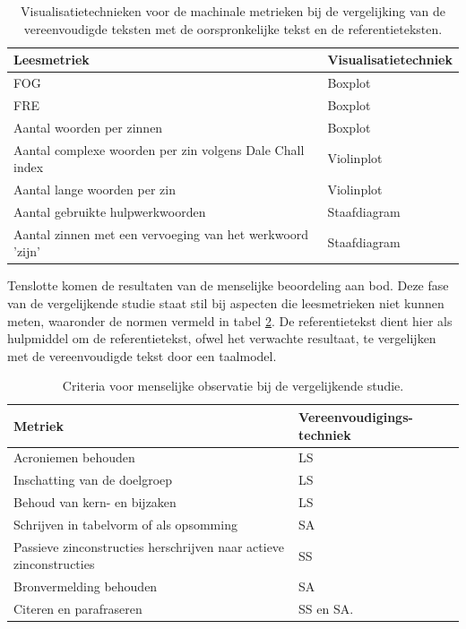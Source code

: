 \begin{center}
	\begin{table}[H]
		\begin{tabular}{ | m{8cm} | m{7cm} | } 
			\hline
			\textbf{Leesmetriek} & \textbf{Visualisatietechniek }\\
			\hline
			FOG & Boxplot \\
			\hline
			FRE & Boxplot \\
			\hline
			Aantal woorden per zinnen & Boxplot \\
			\hline
			Aantal complexe woorden per zin volgens Dale Chall index & Violinplot \\
			\hline
			Aantal lange woorden per zin & Violinplot \\
			\hline
			Aantal gebruikte hulpwerkwoorden & Staafdiagram \\
			\hline
			Aantal zinnen met een vervoeging van het werkwoord 'zijn' & Staafdiagram \\
			\hline
		\end{tabular}
		\caption{Visualisatietechnieken voor de machinale metrieken bij de vergelijking van de vereenvoudigde teksten met de oorspronkelijke tekst en de referentieteksten.}
		\label{table:verg-studie-metrieken}
	\end{table}
\end{center}

Tenslotte komen de resultaten van de menselijke beoordeling aan bod. Deze fase van de vergelijkende studie staat stil bij aspecten die leesmetrieken niet kunnen meten, waaronder de normen vermeld in tabel \ref{table:criteria-vergelijkende-studie-human-obv}. De referentietekst dient hier als hulpmiddel om de referentietekst, ofwel het verwachte resultaat, te vergelijken met de vereenvoudigde tekst door een taalmodel. 

\begin{table}[H]
	\begin{tabular}{| m{10cm} | m{4.5cm} |}
		\hline
		\textbf{Metriek} & \textbf{Vereenvoudigings- techniek} \\ \hline
		Acroniemen behouden & LS 	\\ \hline
		Inschatting van de doelgroep & LS	\\ \hline
		Behoud van kern- en bijzaken & LS \\ \hline
		Schrijven in tabelvorm of als opsomming & SA \\ \hline
		Passieve zinconstructies herschrijven naar actieve zinconstructies & SS \\ \hline
		Bronvermelding behouden &  SA \\ \hline
		Citeren en parafraseren & SS en SA. \\ \hline
	\end{tabular}
	\caption{Criteria voor menselijke observatie bij de vergelijkende studie.}
	\label{table:criteria-vergelijkende-studie-human-obv}
\end{table}

